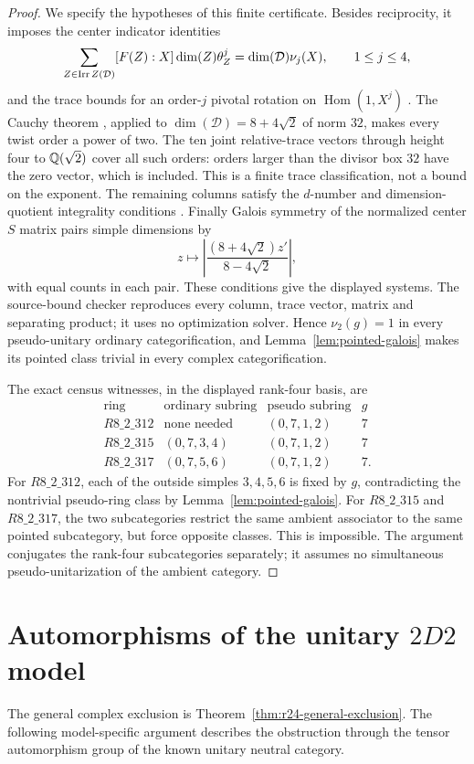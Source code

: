 \begin{proof}
We specify the hypotheses of this finite certificate. Besides
reciprocity, it imposes the center indicator identities
\[
\sum_{Z\in\operatorname{Irr} Z(\mathcal D)}[F(Z):X]\dim(Z)\theta_Z^j
=\dim(\mathcal D)\nu_j(X),\qquad 1\leq j\leq4,
\]
and the trace bounds for an order-$j$ pivotal rotation on
$\operatorname{Hom}(1,X^j)$ \cite{NgIndicators}.
The Cauchy theorem \cite{BNRWCauchy}, applied to
$\dim(\mathcal D)=8+4\sqrt2$ of norm $32$, makes every twist order a
power of two. The ten joint relative-trace vectors through height four
to $\mathbb Q(\sqrt2)$ cover all such orders: orders larger than the divisor
box $32$ have the zero vector, which is included. This is a finite
trace classification, not a bound on the exponent. The remaining
columns satisfy the $d$-number and dimension-quotient integrality
conditions \cite{OstrikCode,EGNO}. Finally Galois symmetry of the
normalized center $S$ matrix \cite{NgCongruence} pairs simple dimensions
by
\[
z\longmapsto
\left|\frac{(8+4\sqrt2)z'}{8-4\sqrt2}\right|,
\]
with equal counts in each pair. These conditions give the displayed
systems. The source-bound checker reproduces every column, trace
vector, matrix and separating product; it uses no optimization solver.
Hence $\nu_2(g)=1$ in every pseudo-unitary ordinary categorification,
and Lemma~\ref{lem:pointed-galois} makes its pointed class trivial in
every complex categorification.

The exact census witnesses, in the displayed rank-four basis, are
\[
\begin{array}{c|cc|c}
\text{ring}&\text{ordinary subring}&\text{pseudo subring}&g\\\hline
R8\_2\_312&\text{none needed}&(0,7,1,2)&7\\
R8\_2\_315&(0,7,3,4)&(0,7,1,2)&7\\
R8\_2\_317&(0,7,5,6)&(0,7,1,2)&7.
\end{array}
\]
For $R8\_2\_312$, each of the outside simples $3,4,5,6$ is fixed by
$g$, contradicting the nontrivial pseudo-ring class by
Lemma~\ref{lem:pointed-galois}. For $R8\_2\_315$ and $R8\_2\_317$,
the two subcategories restrict the same ambient associator to the
same pointed subcategory, but force opposite classes. This is
impossible. The argument conjugates the rank-four subcategories
separately; it assumes no simultaneous pseudo-unitarization of the
ambient category.
\end{proof}

\section{Automorphisms of the unitary \texorpdfstring{$2D2$}{2D2} model}
\label{sec:scoped}
The general complex exclusion is Theorem~\ref{thm:r24-general-exclusion}.
The following model-specific argument describes the obstruction through
the tensor automorphism group of the known unitary neutral category.

